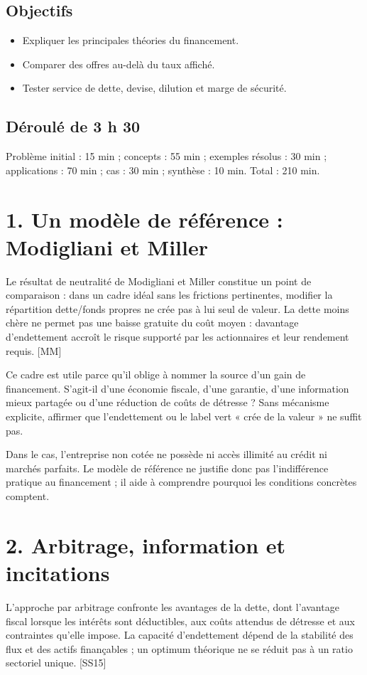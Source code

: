 \documentclass[12pt,a4paper]{article}
\begin{document}
\subsection*{Objectifs}
\begin{itemize}\item Expliquer les principales théories du financement.\item Comparer des offres au-delà du taux affiché.\item Tester service de dette, devise, dilution et marge de sécurité.\end{itemize}
\subsection*{Déroulé de 3 h 30}
Problème initial : 15 min ; concepts : 55 min ; exemples résolus : 30 min ; applications : 70 min ; cas : 30 min ; synthèse : 10 min. Total : 210 min.

\section*{1. Un modèle de référence : Modigliani et Miller}
Le résultat de neutralité de Modigliani et Miller constitue un point de comparaison : dans un cadre idéal sans les frictions pertinentes, modifier la répartition dette/fonds propres ne crée pas à lui seul de valeur. La dette moins chère ne permet pas une baisse gratuite du coût moyen : davantage d’endettement accroît le risque supporté par les actionnaires et leur rendement requis. [MM]


Ce cadre est utile parce qu’il oblige à nommer la source d’un gain de financement. S’agit-il d’une économie fiscale, d’une garantie, d’une information mieux partagée ou d’une réduction de coûts de détresse ? Sans mécanisme explicite, affirmer que l’endettement ou le label vert « crée de la valeur » ne suffit pas.


Dans le cas, l’entreprise non cotée ne possède ni accès illimité au crédit ni marchés parfaits. Le modèle de référence ne justifie donc pas l’indifférence pratique au financement ; il aide à comprendre pourquoi les conditions concrètes comptent.

\section*{2. Arbitrage, information et incitations}
L’approche par arbitrage confronte les avantages de la dette, dont l’avantage fiscal lorsque les intérêts sont déductibles, aux coûts attendus de détresse et aux contraintes qu’elle impose. La capacité d’endettement dépend de la stabilité des flux et des actifs finançables ; un optimum théorique ne se réduit pas à un ratio sectoriel unique. [SS15]
\end{document}
